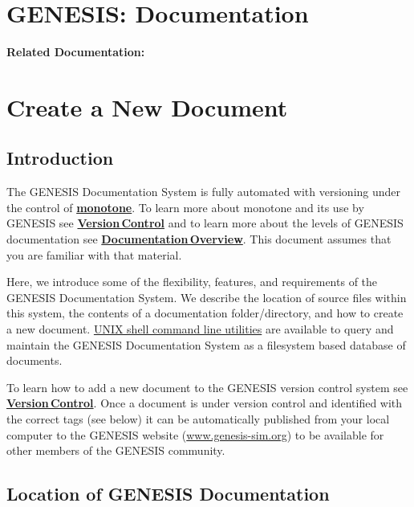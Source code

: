 \documentclass[12pt]{article}
\begin{document}
\section*{GENESIS: Documentation}

{\bf Related Documentation:}

\section*{Create a New Document}

\subsection*{Introduction}

The GENESIS Documentation System is fully automated with versioning
under the control of \href{http://monotone.ca/}{\bf monotone}. To
learn more about monotone and its use by GENESIS see
\href{../version-control/version-control.tex}{\bf Version\,Control}
and to learn more about the levels of GENESIS documentation see
\href{../documentation-overview/documentation-overview.tex}{\bf
  Documentation\,Overview}. This document assumes that you are
familiar with that material.

Here, we introduce some of the flexibility, features, and requirements
of the GENESIS Documentation System. We describe the location of
source files within this system, the contents of a documentation
folder/directory, and how to create a new document.
\href{../document-tools/document-tools.tex}{UNIX shell command line
  utilities} are available to query and maintain the GENESIS
Documentation System as a filesystem based database of documents.

To learn how to add a new document to the GENESIS version control
system see \href{../version-control/version-control.tex}{\bf
  Version\,Control}. Once a document is under version control and
identified with the correct tags (see below) it can be automatically
published from your local computer to the GENESIS website
(\href{http://www.genesis-sim.org/}{www.genesis-sim.org}) to be
available for other members of the GENESIS community.

\subsection*{Location of GENESIS Documentation}
\end{document}
